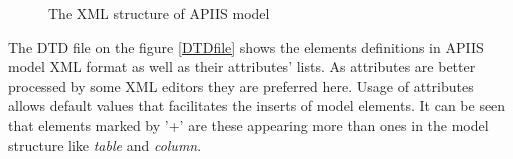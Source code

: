 %
\begin{figure}[htbp]

\caption{The XML structure of APIIS model \label{modeldtd}}

\end{figure}


The DTD file on the figure \ref{DTDfile} shows the elements definitions
in APIIS model XML format as well as their attributes' lists. As attributes
are better processed by some XML editors they are preferred here.
Usage of attributes allows default values that facilitates the inserts
of model elements. It can be seen that elements marked by '+' are
these appearing more than ones in the model structure like \emph{table}
and \emph{column}.

